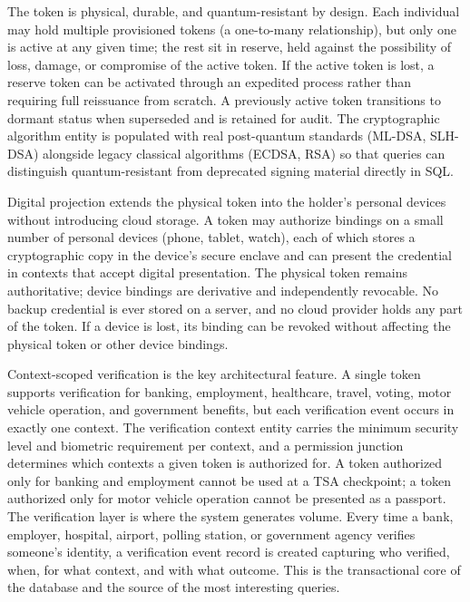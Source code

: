 \documentclass[11pt,letterpaper]{article}
\begin{document}
The token is physical, durable, and quantum-resistant by design. Each individual may hold multiple provisioned tokens (a one-to-many relationship), but only one is active at any given time; the rest sit in reserve, held against the possibility of loss, damage, or compromise of the active token. If the active token is lost, a reserve token can be activated through an expedited process rather than requiring full reissuance from scratch. A previously active token transitions to dormant status when superseded and is retained for audit. The cryptographic algorithm entity is populated with real post-quantum standards (ML-DSA, SLH-DSA) alongside legacy classical algorithms (ECDSA, RSA) so that queries can distinguish quantum-resistant from deprecated signing material directly in SQL.

Digital projection extends the physical token into the holder's personal devices without introducing cloud storage. A token may authorize bindings on a small number of personal devices (phone, tablet, watch), each of which stores a cryptographic copy in the device's secure enclave and can present the credential in contexts that accept digital presentation. The physical token remains authoritative; device bindings are derivative and independently revocable. No backup credential is ever stored on a server, and no cloud provider holds any part of the token. If a device is lost, its binding can be revoked without affecting the physical token or other device bindings.

Context-scoped verification is the key architectural feature. A single token supports verification for banking, employment, healthcare, travel, voting, motor vehicle operation, and government benefits, but each verification event occurs in exactly one context. The verification context entity carries the minimum security level and biometric requirement per context, and a permission junction determines which contexts a given token is authorized for. A token authorized only for banking and employment cannot be used at a TSA checkpoint; a token authorized only for motor vehicle operation cannot be presented as a passport. The verification layer is where the system generates volume. Every time a bank, employer, hospital, airport, polling station, or government agency verifies someone's identity, a verification event record is created capturing who verified, when, for what context, and with what outcome. This is the transactional core of the database and the source of the most interesting queries.
\end{document}
